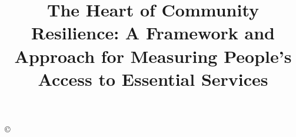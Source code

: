 \documentclass[onecolumn,doublespacing]{risa}
\begin{document}
\jvol{}
\jnum{}
\pubyear{}

\doi{}
\copyright{}
\issnyear{}

\title[The Heart of Community Resilience]{The Heart of Community Resilience: A Framework and Approach for Measuring People's Access to Essential Services}



\end{document}
